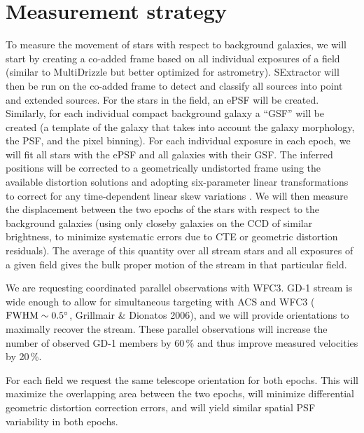 \documentclass[12pt]{article}
\begin{document}
\section*{Measurement strategy}
To measure the movement of stars with respect to background galaxies, we will start by creating a co-added frame based on all individual exposures of a field (similar to MultiDrizzle but better optimized for astrometry).
SExtractor will then be run on the co-added frame to detect and classify all sources into point and extended sources.
For the stars in the field, an ePSF \parencite[effective Point Spread Function;][]{anderson2003} will be created.
Similarly, for each individual compact background galaxy a ``GSF'' will be created (a template of the galaxy that takes into account the galaxy morphology, the PSF, and the pixel binning).
For each individual exposure in each epoch, we will fit all stars with the ePSF and all galaxies with their GSF.
The inferred positions will be corrected to a geometrically undistorted frame using the available distortion solutions \parencite{anderson2004} and adopting six-parameter linear transformations to correct for any time-dependent linear skew variations \parencite{anderson2007}.
We will then measure the displacement between the two epochs of the stars with respect to the background galaxies (using only closeby galaxies on the CCD of similar brightness, to minimize systematic errors due to CTE or geometric distortion residuals).
The average of this quantity over all stream stars and all exposures of a given field gives the bulk proper motion of the stream in that particular field.


\printbibliography[heading=none]



%
%
\specialreq             %
We are requesting coordinated parallel observations with WFC3.
GD-1 stream is wide enough to allow for simultaneous targeting with ACS and WFC3 ($\rm FWHM\sim0.5^\circ$, Grillmair \& Dionatos 2006), and we will provide orientations to maximally recover the stream.
These parallel observations will increase the number of observed GD-1 members by 60\,\% and thus improve measured velocities by 20\,\%.

For each field we request the same telescope orientation for both epochs.
This will maximize the overlapping area between the two epochs, will minimize differential geometric distortion correction errors, and will yield similar spatial PSF variability in both epochs.
\end{document}
